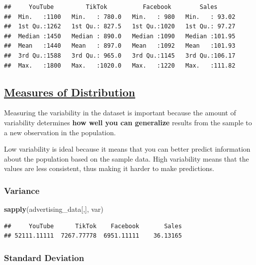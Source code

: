 \documentclass[
]{article}
\newenvironment{Shaded}{\begin{snugshade}}{\end{snugshade}}
\newcommand{\FunctionTok}[1]{\textcolor[rgb]{0.13,0.29,0.53}{\textbf{#1}}}
\newcommand{\NormalTok}[1]{#1}
\begin{document}
\begin{verbatim}
##     YouTube         TikTok          Facebook        Sales       
##  Min.   :1100   Min.   : 780.0   Min.   : 980   Min.   : 93.02  
##  1st Qu.:1262   1st Qu.: 827.5   1st Qu.:1020   1st Qu.: 97.27  
##  Median :1450   Median : 890.0   Median :1090   Median :101.95  
##  Mean   :1440   Mean   : 897.0   Mean   :1092   Mean   :101.93  
##  3rd Qu.:1588   3rd Qu.: 965.0   3rd Qu.:1145   3rd Qu.:106.17  
##  Max.   :1800   Max.   :1020.0   Max.   :1220   Max.   :111.82
\end{verbatim}

\subsection{\texorpdfstring{\ul{\textbf{Measures of
Distribution}}}{Measures of Distribution}}\label{measures-of-distribution}

Measuring the variability in the dataset is important because the amount
of variability determines \textbf{how well you can generalize} results
from the sample to a new observation in the population.

Low variability is ideal because it means that you can better predict
information about the population based on the sample data. High
variability means that the values are less consistent, thus making it
harder to make predictions.

\subsubsection{\texorpdfstring{\textbf{Variance}}{Variance}}\label{variance}

\begin{Shaded}
\begin{Highlighting}[]
\FunctionTok{sapply}\NormalTok{(advertising\_data[,], var)}
\end{Highlighting}
\end{Shaded}

\begin{verbatim}
##     YouTube      TikTok    Facebook       Sales 
## 52111.11111  7267.77778  6951.11111    36.13165
\end{verbatim}

\subsubsection{\texorpdfstring{\textbf{Standard
Deviation}}{Standard Deviation}}\label{standard-deviation}
\end{document}
